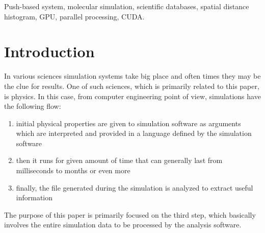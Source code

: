\documentclass[10pt,journal,final,letterpaper,twocolumn]{IEEEtran}
\begin{document}
\begin{IEEEkeywords}
Push-based system, molecular simulation, scientific databases,
spatial distance histogram, GPU, parallel processing, CUDA.
\end{IEEEkeywords}


\section{Introduction}\label{sc:intro}

In various sciences simulation systems take big place and often times they may be the clue for results. One of such sciences, which is primarily related to this paper, is physics. In this case, from computer engineering point of view, simulations have the following flow:

\vspace{5mm}

{\small
\begin{enumerate}
	\item initial physical properties are given to simulation software as arguments which are interpreted and provided in a language defined by the simulation software
	\item then it runs for given amount of time that can generally last from milliseconds to months or even more
	\item finally, the file generated during the simulation is analyzed to extract useful information
\end{enumerate}
}
\vspace{3mm}
The purpose of this paper is primarily focused on the third step, which basically involves the entire simulation data to be processed by the analysis software.
\end{document}
